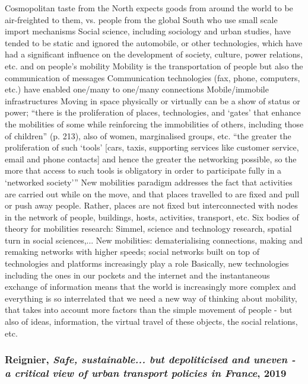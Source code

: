\documentclass{article}
\begin{document}
\begin{outline}
	\1 Cosmopolitan taste from the North expects goods from around the world to be air-freighted to them, vs. people from the global South who use small scale import mechanisms
	\1 Social science, including sociology and urban studies, have tended to be static and ignored the automobile, or other technologies, which have had a significant influence on the development of society, culture, power relations, etc. and on people's mobility
	\1 Mobility is the transportation of people but also the communication of messages
		\2 Communication technologies (fax, phone, computers, etc.) have enabled one/many to one/many connections
		\2 Mobile/immobile infrastructures
	\1 Moving in space physically or virtually can be a show of status or power; ``there is the proliferation of places, technologies, and `gates' that enhance the mobilities of some while reinforcing the immobilities of others, including those of children'' (p. 213), also of women, marginalised groups, etc.
	\1 ``the greater the proliferation of such `tools' [cars, taxis, supporting services like customer service, email and phone contacts] and hence the greater the networking possible, so the more that access to such tools is obligatory in order to participate fully in a `networked society'''
	\1 New mobilities paradigm addresses the fact that activities are carried out while on the move, and that places travelled to are fixed and pull or push away people. Rather, places are not fixed but interconnected with nodes in the network of people, buildings, hosts, activities, transport, etc.
	\1 Six bodies of theory for mobilities research:
		\2 Simmel, science and technology research, spatial turn in social sciences,...
	\1 New mobilities: dematerialising connections, making and remaking networks with higher speeds; social networks built on top of technologies and platforms increasingly play a role 
	\1 Basically, new technologies including the ones in our pockets and the internet and the instantaneous exchange of information means that the world is increasingly more complex and everything is so interrelated that we need a new way of thinking about mobility, that takes into account more factors than the simple movement of people - but also of ideas, information, the virtual travel of these objects, the social relations, etc.		
\end{outline}

\subsubsection{Reignier, \textit{Safe, sustainable... but depoliticised and uneven - a critical view of urban transport policies in France}, 2019}
\end{document}
